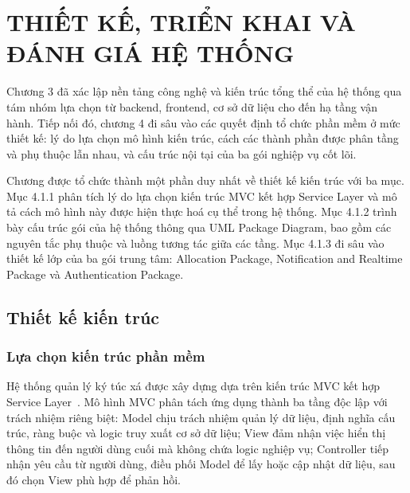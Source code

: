 ﻿\documentclass[a4paper,12pt,openany,oneside]{report}
\begin{document}
\chapter{THIẾT KẾ, TRIỂN KHAI VÀ ĐÁNH GIÁ HỆ THỐNG}

Chương 3 đã xác lập nền tảng công nghệ và kiến trúc tổng thể của hệ thống qua
tám nhóm lựa chọn từ backend, frontend, cơ sở dữ liệu cho đến hạ tầng vận hành.
Tiếp nối đó, chương 4 đi sâu vào các quyết định tổ chức phần mềm ở mức thiết
kế: lý do lựa chọn mô hình kiến trúc, cách các thành phần được phân tầng và
phụ thuộc lẫn nhau, và cấu trúc nội tại của ba gói nghiệp vụ cốt lõi.

Chương được tổ chức thành một phần duy nhất về thiết kế kiến trúc với ba mục.
Mục 4.1.1 phân tích lý do lựa chọn kiến trúc MVC kết hợp Service Layer và mô
tả cách mô hình này được hiện thực hoá cụ thể trong hệ thống. Mục 4.1.2 trình
bày cấu trúc gói của hệ thống thông qua UML Package Diagram, bao gồm các nguyên
tắc phụ thuộc và luồng tương tác giữa các tầng. Mục 4.1.3 đi sâu vào thiết kế
lớp của ba gói trung tâm: Allocation Package, Notification and Realtime Package
và Authentication Package.

\section{Thiết kế kiến trúc}
\label{sec:arch_design}

\subsection{Lựa chọn kiến trúc phần mềm}
\label{subsec:arch_choice}

Hệ thống quản lý ký túc xá được xây dựng dựa trên kiến trúc MVC kết hợp
Service Layer~\cite{fowler2002patterns}. Mô hình MVC phân tách ứng dụng thành
ba tầng độc lập với trách nhiệm riêng biệt: Model chịu trách nhiệm quản lý dữ
liệu, định nghĩa cấu trúc, ràng buộc và logic truy xuất cơ sở dữ liệu; View
đảm nhận việc hiển thị thông tin đến người dùng cuối mà không chứa logic nghiệp
vụ; Controller tiếp nhận yêu cầu từ người dùng, điều phối Model để lấy hoặc
cập nhật dữ liệu, sau đó chọn View phù hợp để phản hồi.
\end{document}
